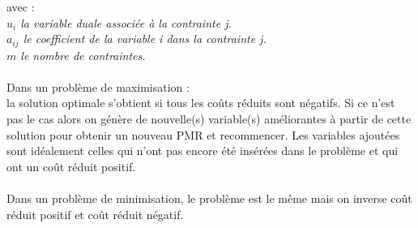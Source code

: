 avec :\\
\textit{$u_i$ la variable duale associée à la contrainte j.\\
$a_{ij}$ le coefficient de la variable i dans la contrainte j.\\
$m$ le nombre de contraintes.\\}
\\
Dans un problème de maximisation :\\
la solution optimale s'obtient si tous les coûts réduits sont négatifs. Si ce n'est pas le cas alors on génère de nouvelle(s) variable(s) améliorantes à partir de cette solution pour obtenir un nouveau PMR et recommencer. Les variables ajoutées sont idéalement celles qui n'ont pas encore été insérées dans le problème et qui ont un coût réduit positif.\\
\\
Dans un problème de minimisation, le problème est le même mais on inverse coût réduit positif et coût réduit négatif.
